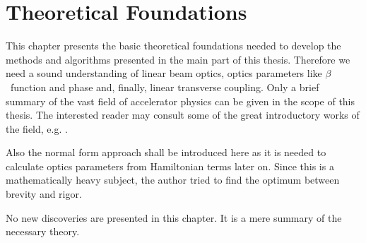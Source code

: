 \chapter{Theoretical Foundations}
\label{ch_introduction}

\begin{chapterinfo}
    This chapter presents the basic theoretical foundations needed to develop
    the methods and algorithms presented in the main part of this thesis.
    Therefore we need a sound understanding of linear beam optics, 
    optics parameters like $\beta$~function and phase and, finally, linear transverse coupling.
    Only a brief summary of the vast field of accelerator physics can be given in the scope of this
    thesis. The interested reader may consult some of the great introductory works of the field, e.g.
    \cite{CAS2003, Wiedemann2015, WolskiBook}.

    Also the normal form approach shall be introduced here as it is needed to calculate optics
    parameters from Hamiltonian terms later on. Since this is a mathematically heavy subject,
    the author tried to find the optimum between brevity and rigor. 
    
    No new discoveries are presented in this chapter. It is a mere summary of the necessary theory.

\end{chapterinfo}

